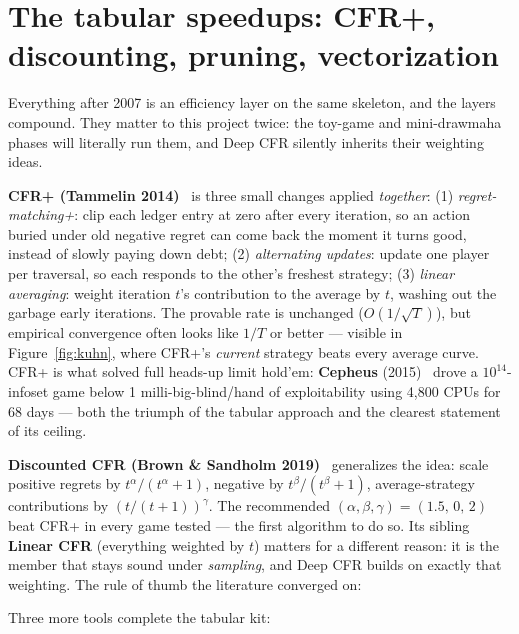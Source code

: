 \section{The tabular speedups: CFR+, discounting, pruning, vectorization}\label{sec:speedups}

Everything after 2007 is an efficiency layer on the same skeleton, and the layers compound. They matter to this project twice: the toy-game and mini-drawmaha phases will literally run them, and Deep CFR silently inherits their weighting ideas.

\textbf{CFR+ (Tammelin 2014)}~\cite{tammelin2014,tammelin2015} is three small changes applied \emph{together}: (1) \emph{regret-matching+}: clip each ledger entry at zero after every iteration, so an action buried under old negative regret can come back the moment it turns good, instead of slowly paying down debt; (2) \emph{alternating updates}: update one player per traversal, so each responds to the other's freshest strategy; (3) \emph{linear averaging}: weight iteration $t$'s contribution to the average by $t$, washing out the garbage early iterations. The provable rate is unchanged ($O(1/\sqrt{T})$), but empirical convergence often looks like $1/T$ or better --- visible in Figure~\ref{fig:kuhn}, where CFR+'s \emph{current} strategy beats every average curve. CFR+ is what solved full heads-up limit hold'em: \textbf{Cepheus} (2015)~\cite{bowling2015} drove a $10^{14}$-infoset game below 1 milli-big-blind/hand of exploitability using 4{,}800 CPUs for 68 days --- both the triumph of the tabular approach and the clearest statement of its ceiling. 

\textbf{Discounted CFR (Brown \& Sandholm 2019)}~\cite{brown2019dcfr} generalizes the idea: scale positive regrets by $t^\alpha/(t^\alpha{+}1)$, negative by $t^\beta/(t^\beta{+}1)$, average-strategy contributions by $(t/(t{+}1))^\gamma$. The recommended $(\alpha,\beta,\gamma)=(1.5,\,0,\,2)$ beat CFR+ in every game tested --- the first algorithm to do so. Its sibling \textbf{Linear CFR} (everything weighted by $t$) matters for a different reason: it is the member that stays sound under \emph{sampling}, and Deep CFR builds on exactly that weighting. The rule of thumb the literature converged on: 

Three more tools complete the tabular kit:

